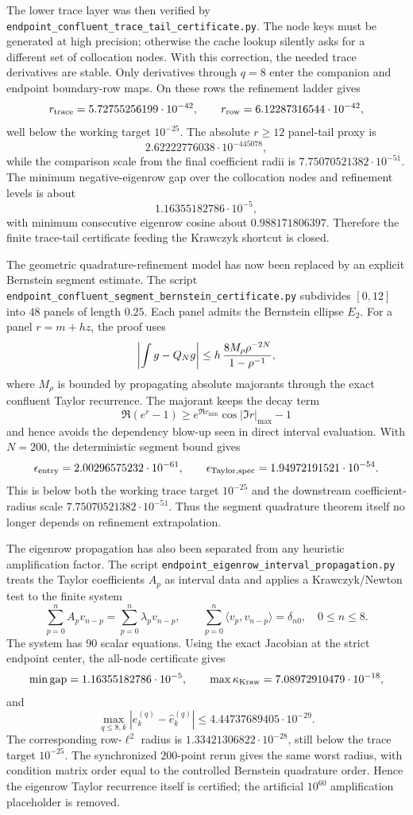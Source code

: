 \documentclass[11pt]{article}
\begin{document}
The lower trace layer was then verified by
\texttt{endpoint\_confluent\_trace\_tail\_certificate.py}.  The node keys must
be generated at high precision; otherwise the cache lookup silently asks for a
different set of collocation nodes.  With this correction, the needed trace
derivatives are stable.  Only derivatives through \(q=8\) enter the companion
and endpoint boundary-row maps.  On these rows the refinement ladder gives
\[
  r_{\rm trace}=5.72755256199\cdot10^{-42},
  \qquad
  r_{\rm row}=6.12287316544\cdot10^{-42},
\]
well below the working target \(10^{-25}\).  The absolute \(r\ge12\) panel-tail
proxy is
\[
  2.62222776038\cdot10^{-445078},
\]
while the comparison scale from the final coefficient radii is
\(7.75070521382\cdot10^{-51}\).  The minimum negative-eigenrow gap over the
collocation nodes and refinement levels is about
\[
  1.16355182786\cdot10^{-5},
\]
with minimum consecutive eigenrow cosine about \(0.988171806397\).  Therefore
the finite trace-tail certificate feeding the Krawczyk shortcut is closed.

The geometric quadrature-refinement model has now been replaced by an explicit
Bernstein segment estimate.  The script
\texttt{endpoint\_confluent\_segment\_bernstein\_certificate.py} subdivides
\([0,12]\) into \(48\) panels of length \(0.25\).  Each panel admits the
Bernstein ellipse \(E_2\).  For a panel \(r=m+hz\), the proof uses
\[
  \left|\int g-Q_Ng\right|
  \le
  h\,{8M_\rho\rho^{-2N}\over 1-\rho^{-1}},
\]
where \(M_\rho\) is bounded by propagating absolute majorants through the exact
confluent Taylor recurrence.  The majorant keeps the decay term
\[
  \Re(e^r-1)\ge e^{\Re r_{\min}}\cos |\Im r|_{\max}-1
\]
and hence avoids the dependency blow-up seen in direct interval evaluation.
With \(N=200\), the deterministic segment bound gives
\[
  \epsilon_{\rm entry}=2.00296575232\cdot10^{-61},\qquad
  \epsilon_{\rm Taylor,spec}=1.94972191521\cdot10^{-54}.
\]
This is below both the working trace target \(10^{-25}\) and the downstream
coefficient-radius scale \(7.75070521382\cdot10^{-51}\).  Thus the segment
quadrature theorem itself no longer depends on refinement extrapolation.

The eigenrow propagation has also been separated from any heuristic
amplification factor.  The script
\texttt{endpoint\_eigenrow\_interval\_propagation.py} treats the Taylor
coefficients \(A_p\) as interval data and applies a Krawczyk/Newton test to
the finite system
\[
  \sum_{p=0}^n A_pv_{n-p}
  =
  \sum_{p=0}^n\lambda_pv_{n-p},\qquad
  \sum_{p=0}^n\langle v_p,v_{n-p}\rangle=\delta_{n0},
  \quad 0\le n\le 8.
\]
The system has \(90\) scalar equations.  Using the exact Jacobian at the
strict endpoint center, the all-node certificate gives
\[
  \min\operatorname{gap}=1.16355182786\cdot10^{-5},\qquad
  \max\kappa_{\rm Kraw}=7.08972910479\cdot10^{-18},
\]
and
\[
  \max_{q\le8,k}|e_k^{(q)}-\widehat e_k^{(q)}|
  \le
  4.44737689405\cdot10^{-29}.
\]
The corresponding row-\(\ell^2\) radius is \(1.33421306822\cdot10^{-28}\),
still below the trace target \(10^{-25}\).  The synchronized \(200\)-point
rerun gives the same worst radius, with condition matrix order equal to the
controlled Bernstein quadrature order.  Hence the eigenrow Taylor recurrence
itself is certified; the artificial \(10^{60}\) amplification placeholder is
removed.
\end{document}
